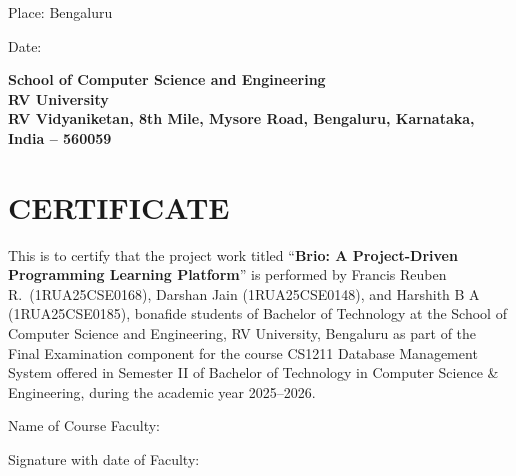 \documentclass[12pt,a4paper]{article}
\begin{document}
\vspace{1cm}

Place: Bengaluru

Date: \underline{\hspace{5cm}}

\newpage
\begin{center}
{\large\bfseries School of Computer Science and Engineering\\
RV University\\
RV Vidyaniketan, 8th Mile, Mysore Road, Bengaluru, Karnataka, India -- 560059}
\end{center}

\vspace{1cm}

\section*{CERTIFICATE}

This is to certify that the project work titled ``\textbf{Brio: A Project-Driven Programming
Learning Platform}'' is performed by Francis Reuben R.\ (1RUA25CSE0168), Darshan Jain
(1RUA25CSE0148), and Harshith B A (1RUA25CSE0185), bonafide students of Bachelor of Technology
at the School of Computer Science and Engineering, RV University, Bengaluru as part of the Final
Examination component for the course CS1211 Database Management System offered in Semester II of
Bachelor of Technology in Computer Science \& Engineering, during the academic year 2025--2026.

\vspace{3cm}

Name of Course Faculty: \underline{\hspace{7cm}}

\vspace{1cm}

Signature with date of Faculty: \underline{\hspace{7cm}}

\newpage
\tableofcontents

\newpage
{}

\end{document}
